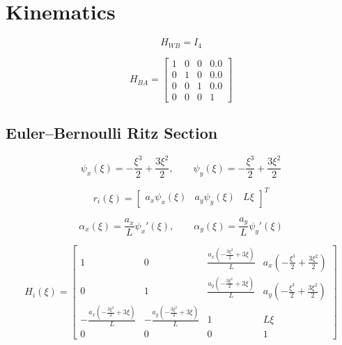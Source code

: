 \documentclass[11pt]{article}
\begin{document}
\section{Kinematics}
\begin{equation}
H_{WB}=I_4
\end{equation}

\begin{equation}
H_{BA}=\begin{bmatrix}1 & 0 & 0 & 0.0\\0 & 1 & 0 & 0.0\\0 & 0 & 1 & 0.0\\0 & 0 & 0 & 1\end{bmatrix}\label{eq:mount-transform}
\end{equation}

\subsection{Euler--Bernoulli Ritz Section}
\begin{equation}
\psi_x(\xi)=- \frac{\xi^{3}}{2} + \frac{3 \xi^{2}}{2},\qquad\psi_y(\xi)=- \frac{\xi^{3}}{2} + \frac{3 \xi^{2}}{2}
\end{equation}

\begin{equation}
r_i(\xi)=\begin{bmatrix}a_x\psi_x(\xi)&a_y\psi_y(\xi)&L\xi\end{bmatrix}^T
\end{equation}

\begin{equation}
\alpha_x(\xi)=\frac{a_x}{L}\psi_x'(\xi),\qquad \alpha_y(\xi)=\frac{a_y}{L}\psi_y'(\xi)
\end{equation}

\begin{equation}
H_i(\xi)=\begin{bmatrix}1 & 0 & \frac{a_x \left(- \frac{3 \xi^{2}}{2} + 3 \xi\right)}{L} & a_x \left(- \frac{\xi^{3}}{2} + \frac{3 \xi^{2}}{2}\right)\\0 & 1 & \frac{a_y \left(- \frac{3 \xi^{2}}{2} + 3 \xi\right)}{L} & a_y \left(- \frac{\xi^{3}}{2} + \frac{3 \xi^{2}}{2}\right)\\- \frac{a_x \left(- \frac{3 \xi^{2}}{2} + 3 \xi\right)}{L} & - \frac{a_y \left(- \frac{3 \xi^{2}}{2} + 3 \xi\right)}{L} & 1 & L \xi\\0 & 0 & 0 & 1\end{bmatrix}\label{eq:local-transform}
\end{equation}
\end{document}
